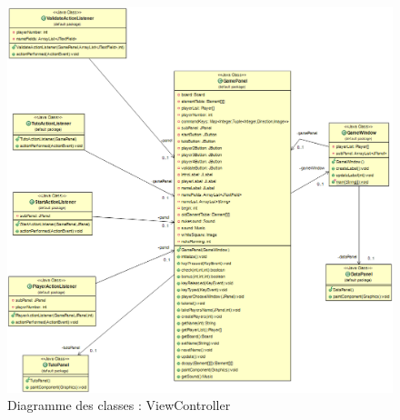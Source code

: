 		
		\begin{figure}[H]		
  			\includegraphics[scale=0.45]{ch1/ViewController}
            \caption {Diagramme des classes : ViewController }
        \end{figure}		
            
        
